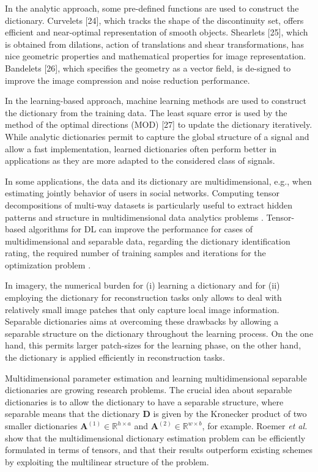 In the analytic approach, some pre-defined functions are used to construct the dictionary. Curvelets [24], which tracks the shape of the discontinuity set, offers efficient and near-optimal representation of smooth objects. Shearlets [25], which is obtained from dilations, action of translations and shear transformations, has nice geometric properties and mathematical properties for image representation. Bandelets [26], which specifies the geometry as a vector field, is de-signed to improve the image compression and noise reduction performance. 

In the learning-based approach, machine learning methods are used to construct the dictionary from the training data. The least square error is used by the method of the optimal directions (MOD) [27] to update the dictionary iteratively. While analytic dictionaries permit to capture the global structure of a signal and allow a fast implementation, learned dictionaries often perform better in applications as they are more adapted to the considered class of signals.

In some applications, the data and its dictionary are multidimensional, e.g., when estimating jointly behavior of users in social networks. Computing tensor decompositions of multi-way datasets is particularly useful to extract hidden patterns and structure in multidimensional data analytics problems \cite{kolda2009tensor}. Tensor-based algorithms for DL can improve the performance for cases of multidimensional and separable data, regarding the dictionary identification rating, the required number of training samples and iterations for the optimization problem \cite{roemer2014tensor}. 

In imagery, the numerical burden for (i) learning a dictionary and for (ii) employing the dictionary for reconstruction tasks only allows to deal with relatively small image patches that only capture local image information. Separable dictionaries aims at overcoming these drawbacks by allowing a separable structure on the dictionary throughout the learning process. On the one hand, this permits larger patch-sizes for the learning phase, on the other hand, the dictionary is applied efficiently in reconstruction tasks. 

Multidimensional parameter estimation and learning multidimensional separable dictionaries are growing research problems. The crucial idea about separable dictionaries is to allow the dictionary to have a separable structure, where separable means that the dictionary $\textbf{D}$ is given by the Kronecker product of two smaller dictionaries $\boldsymbol{A}^{(1)} \in \mathbb{R}^{h \times a}$ and $\boldsymbol{A}^{(2)} \in \mathbb{R}^{w \times b}$, for example. Roemer \emph{et al.} \cite{roemer2014tensor} show that the multidimensional dictionary estimation problem can be efficiently formulated in terms of tensors, and that their results outperform existing schemes by exploiting the multilinear structure of the problem.

